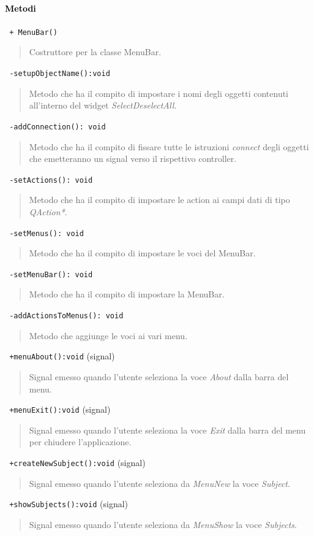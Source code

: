 \paragraph{\textcolor{black}{Metodi\\}}
\color{blue}\verb! + MenuBar()!
\begin{quote}
\color{black}Costruttore per la classe MenuBar. \\
\end{quote}
\color{blue}\verb! -setupObjectName():void!
\color{black}
\begin{quote}Metodo che ha il compito di impostare i nomi degli oggetti contenuti all'interno del widget \emph{SelectDeselectAll}.
\end{quote}
\color{blue}\verb! -addConnection(): void!
\color{black} 
\begin{quote}
Metodo che ha il compito di fissare tutte le istruzioni \emph{connect} degli oggetti che emetteranno un signal\g{} verso il rispettivo controller.
\end{quote} 
\color{blue}\verb! -setActions(): void!
\color{black} 
\begin{quote}
Metodo che ha il compito di impostare le action ai campi dati di tipo \emph{QAction*}.
\end{quote} 
\color{black}
\color{blue}\verb! -setMenus(): void!
\color{black} 
\begin{quote}
Metodo che ha il compito di impostare le voci del MenuBar.
\end{quote} 
\color{blue}\verb! -setMenuBar(): void!
\color{black} 
\begin{quote}
Metodo che ha il compito di impostare la MenuBar.
\end{quote} 
\color{blue}\verb! -addActionsToMenus(): void!
\color{black} 
\begin{quote}
Metodo che aggiunge le voci ai vari menu.
\end{quote} 
\color{blue}\verb! +menuAbout():void! (signal)
\color{black} 
\begin{quote}
Signal\g{} emesso quando l'utente seleziona la voce \emph{About} dalla barra del menu.
\end{quote}
\color{blue}\verb! +menuExit():void! (signal)
\color{black} 
\begin{quote}
Signal\g{} emesso quando l'utente seleziona la voce \emph{Exit} dalla barra del menu per chiudere l'applicazione.
\end{quote}
\color{blue}\verb! +createNewSubject():void! (signal)
\color{black} 
\begin{quote}
Signal\g{} emesso quando l'utente seleziona da \emph{MenuNew} la voce \emph{Subject}.
\end{quote}
\color{blue}\verb! +showSubjects():void! (signal)
\color{black} 
\begin{quote}
Signal\g{} emesso quando l'utente seleziona da \emph{MenuShow} la voce \emph{Subjects}.
\end{quote}

